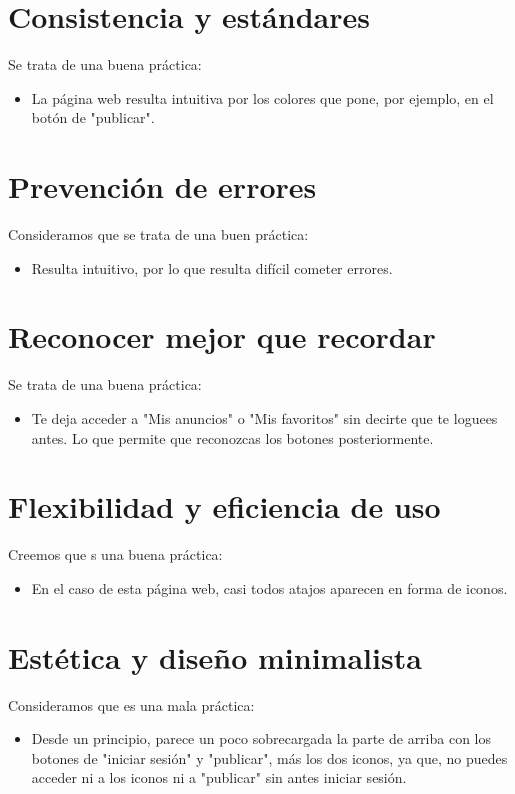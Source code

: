 \documentclass[openany,overnay,a4paper, twoside, 14pt]{book}
\begin{document}
\section*{Consistencia y estándares}
Se trata de una buena práctica:
\begin{itemize}
\item La página web resulta intuitiva por los colores que pone, por ejemplo, en el botón de "publicar".
\end{itemize}
\section*{Prevención de errores}
Consideramos que se trata de una buen práctica:
\begin{itemize}
\item Resulta intuitivo, por lo que resulta difícil cometer errores.
\end{itemize}
\section*{Reconocer mejor que recordar}
Se trata de una buena práctica:
\begin{itemize}
    \item Te deja acceder a "Mis anuncios" o "Mis favoritos" sin decirte que te loguees antes. Lo que permite que reconozcas los botones posteriormente.
\end{itemize}
\section*{Flexibilidad y eficiencia de uso}
Creemos que s una buena práctica:
\begin{itemize}
    \item En el caso de esta página web, casi todos atajos aparecen en forma de iconos.
\end{itemize}
\section*{Estética y diseño minimalista}
Consideramos que es una mala práctica:
\begin{itemize}
    \item Desde un principio, parece un poco sobrecargada la parte de arriba con los botones de "iniciar sesión" y "publicar", más los dos iconos, ya que, no puedes acceder ni a los iconos ni a "publicar" sin antes iniciar sesión.
\end{itemize}
\end{document}
